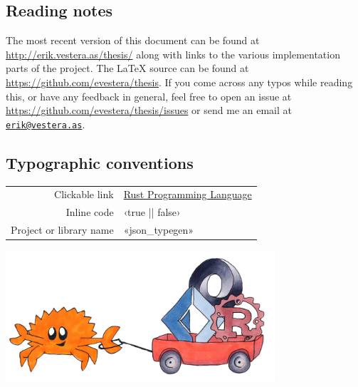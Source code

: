 
\vspace*{2cm}
\thispagestyle{plain}

\begin{center}

{}

\section*{\hfil Reading notes \hfil}

\end{center}

The most recent version of this document can be found at \url{http://erik.vestera.as/thesis/} along with links to the various implementation parts of the project. The LaTeX source can be found at \url{https://github.com/evestera/thesis}. If you come across any typos while reading this, or have any feedback in general, feel free to open an issue at \url{https://github.com/evestera/thesis/issues} or send me an email at \href{mailto:erik@vestera.as}{\nolinkurl{erik@vestera.as}}.

\begin{center}

\subsection*{\hfil Typographic conventions \hfil}

\begin{tabular}{ r l }
Clickable link & \href{https://www.rust-lang.org/}{Rust Programming Language} \\
Inline code & ‹true || false› \\
Project or library name & «json_typegen» \\
\end{tabular}

\vspace*{1cm}
\includegraphics[width=10cm, angle=0, trim=10 10 10 10, clip]{ferris/cart}

\end{center}
